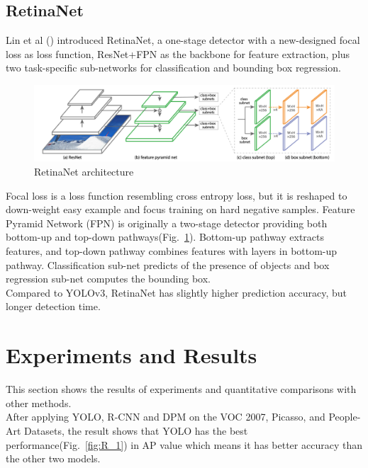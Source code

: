 \documentclass[letterpaper]{article} %
\begin{document}
\subsection{RetinaNet}
Lin et al (\citeyear{retinaNet}) introduced RetinaNet, a one-stage detector with a new-designed focal loss as loss function, ResNet+FPN as the backbone for feature extraction, plus two task-specific sub-networks for classification and bounding box regression.\\
\begin{figure}[ht]
\hspace{-16mm}
\centering
\includegraphics[scale = 0.2]{Figure/retinanet.png}
\caption{\footnotesize{RetinaNet architecture}}
\label{fig:retinanet}
\vspace{0mm}
\end{figure}

\noindent Focal loss is a loss function resembling cross entropy loss, but it is reshaped to down-weight easy example and focus training on hard negative samples. Feature Pyramid Network (FPN) is originally a two-stage detector providing both bottom-up and top-down pathways(Fig.~\ref{fig:retinanet}). Bottom-up pathway extracts features, and top-down pathway combines features with layers in bottom-up pathway. Classification sub-net predicts of the presence of objects and box regression sub-net computes the bounding box.\\

\noindent Compared to YOLOv3, RetinaNet has slightly higher prediction accuracy, but longer detection time.

\section{Experiments and Results}
This section shows the results of experiments and quantitative comparisons with other methods.\\

\noindent After applying YOLO, R-CNN and DPM on the VOC 2007, Picasso, and People-Art Datasets, the result shows that YOLO has the best performance(Fig.~\ref{fig:R_1}) in AP value which means it has better accuracy than the other two models.
\end{document}
